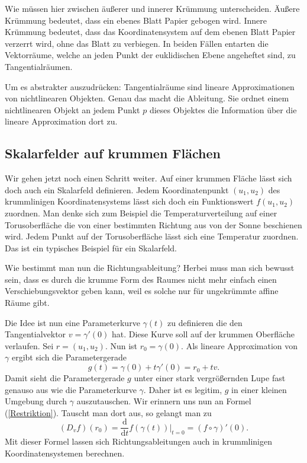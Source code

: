 \documentclass[a4paper,12pt,fleqn,dvipdfmx]{article}
\begin{document}
Wie müssen hier zwischen äußerer und innerer Krümmung unterscheiden.
Äußere Krümmung bedeutet, dass ein ebenes Blatt Papier gebogen
wird. Innere Krümmung bedeutet, dass das Koordinatensystem auf
dem ebenen Blatt Papier verzerrt wird, ohne das Blatt zu verbiegen.
In beiden Fällen entarten die Vektorräume, welche an jeden Punkt
der euklidischen Ebene angeheftet sind, zu Tangentialräumen.

Um es abstrakter auszudrücken: Tangentialräume sind lineare
Approximationen von nichtlinearen Objekten. Genau das macht
die Ableitung. Sie ordnet einem nichtlinearen Objekt an jedem
Punkt $p$ dieses Objektes die Information über die lineare
Approximation dort zu.

\subsection{Skalarfelder auf krummen Flächen}

Wir gehen jetzt noch einen Schritt weiter.
Auf einer krummen Fläche lässt sich doch auch ein
Skalarfeld definieren. Jedem Koordinatenpunkt $(u_1,u_2)$
des krummlinigen Koordinatensystems lässt sich doch
ein Funktionswert $f(u_1,u_2)$ zuordnen. Man denke sich zum Beispiel
die Temperaturverteilung auf einer Torusoberfläche die von einer
bestimmten Richtung aus von der Sonne beschienen wird. Jedem Punkt
auf der Torusoberfläche lässt sich eine Temperatur zuordnen.
Das ist ein typisches Beispiel für ein Skalarfeld.

Wie bestimmt man nun die Richtungsableitung? Herbei muss man sich
bewusst sein, dass es durch die krumme Form des Raumes nicht mehr
einfach einen Verschiebungsvektor geben kann, weil es solche nur für
ungekrümmte affine Räume gibt.

Die Idee ist nun eine Parameterkurve $\gamma(t)$ zu definieren die den
Tangentialvektor $v=\gamma'(0)$ hat. Diese Kurve soll auf der
krummen Oberfläche verlaufen. Sei $r=(u_1,u_2)$. Nun ist
$r_0=\gamma(0)$. Als lineare Approximation von $\gamma$ ergibt
sich die Parametergerade
\begin{equation}
g(t) = \gamma(0)+t\gamma'(0) = r_0+tv.
\end{equation}
Damit sieht die Parametergerade $g$ unter einer stark vergrößernden
Lupe fast genauso aus wie die Parameterkurve $\gamma$. Daher
ist es legitim, $g$ in einer kleinen Umgebung durch $\gamma$
auszutauschen. Wir erinnern uns nun an Formel (\ref{Restriktion}).
Tauscht man dort aus, so gelangt man zu
\begin{equation}\label{via-gamma}
(D_v f)(r_0) = \frac{\mathrm d}{\mathrm dt}f(\gamma(t))\Big|_{t=0}
= (f\circ\gamma)'(0).
\end{equation}
Mit dieser Formel lassen sich Richtungsableitungen auch
in krummlinigen Koordinatensystemen berechnen.
\end{document}
